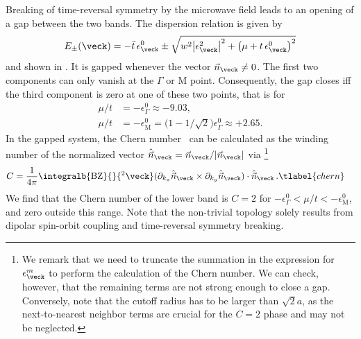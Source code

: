 Breaking of time-reversal symmetry by the microwave field leads to an opening of a gap between the two bands.
The dispersion relation is given by
\begin{align}
    E_\pm(\veck)=- \bar{t}\, \epsilon^0_\veck \pm \sqrt{w^2 \big|\epsilon^2_{\veck}\big|^2+\big(\mu+t\, \epsilon^0_{\veck}\big)^2}
\end{align}
and shown in .
It is gapped whenever the vector $\vec{n}_{\veck}\ne 0$.
The first two components can only vanish at the $\Gamma$ or $\text{M}$ point.
Consequently, the gap closes iff the third component is zero at one of these two points, that is for
\begin{align} %
    \mu/t &= -\epsilon^0_{\Gamma} \approx -9.03, \nonumber\\
    \mu/t &= -\epsilon^0_\text{M} = \Big(1-1/\sqrt{2}\Big)\epsilon_{\Gamma}^0 \approx +2.65.
\end{align}
In the gapped system, the Chern number~\cite{Hasan2010,Qi2011} can be calculated as the winding number of the normalized vector $\hat{\vec{n}}_\veck = \vec{n}_\veck/|\vec{n}_\veck|$ via
\footnote{We remark that we need to truncate the summation in the expression for $\epsilon^m_{\veck}$ to perform the calculation of the Chern number.
We can check, however, that the remaining terms are not strong enough to close a gap.
Conversely, note that the cutoff radius has to be larger than $\sqrt{2}a$, as the next-to-nearest neighbor terms are crucial for the $C=2$ phase and may not be neglected.}
\begin{align}
    C &= \frac{1}{4\pi}\integralb{\text{BZ}}{}{^2\veck} ( \partial_{k_x} \hat{\vec{n}}_{\veck} \times \partial_{k_y} \hat{\vec{n}}_{\veck} ) \cdot \hat{\vec{n}}_{\veck} \, . \tlabel{chern}
\end{align}
We find that the Chern number of the lower band is $C=2$ for $-\epsilon^0_{\Gamma} < \mu/t < -\epsilon^0_\text{M}$, and zero outside this range.
Note that the non-trivial topology solely results from dipolar spin-orbit coupling and time-reversal symmetry breaking.

